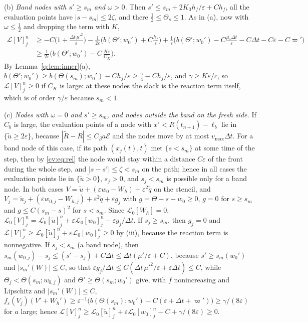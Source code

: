 \documentclass[11pt]{amsart}
\theoremstyle{definition}
\theoremstyle{remark}
\newcommand{\ve}{\varepsilon}
\newcommand{\Lop}{\mathcal{L}}
\begin{document}
\smallskip
(b) \emph{Band nodes with $s'\ge s_m$ and $\omega>0$.} Then
$s'\le s_m+2K_0h_f/\ve+Ch_f$, all the
evaluation points have $|s-s_m|\le2\zeta$, and there $\frac12\le\Theta_s\le1$. As in (a), now with
$\omega\le\frac12$ and dropping the term with $K$,
\begin{align*}
\Lop[V]^n_j&\ge-C\Big(1+\frac{\Delta t\,\mu'^2}\ve\Big)-\frac1{2\ve}\Big(b(\Theta';w_0')+C\frac{h_f}\ve\Big)
+\frac1\ve\Big(b(\Theta';w_0')-C\frac{\mu_*\Delta t}\ve-C\Delta t-C\ve-C\varpi'\Big)\\
&\ge\frac1{2\ve}\Big(b(\Theta';w_0')-C\,\frac{K\ve}{C_K}\Big).
\end{align*}
By Lemma~\ref{q:lem:inner}(a), $b(\Theta';w_0')\ge b(\Theta(s_m);w_0')-Ch_f/\ve\ge\frac\gamma4-Ch_f/\ve$, and
$\gamma\ge K\ve/c$, so $\Lop[V]^n_j\ge0$ if $C_K$ is large: at these nodes the slack is the
reaction term itself, which is of order $\gamma/\ve$ because $s_m<1$.

\smallskip
(c) \emph{Nodes with $\omega=0$ and $s'\ge s_m$, and nodes outside the band on the fresh side.}
If $C_b$ is large, the evaluation points of a node with $x'<R(t_{n+1})-\ell_b$ lie in
$\{\tilde u\ge2\ve\}$, because $|\tilde R-R|\le C_\beta a\mathcal E$ and the nodes move by at most
$v_{\max}\Delta t$. For a band node of this case, if its path $(x_j(t),t)$ met $\{s<s_m\}$
at some time of the step, then by \eqref{cv:eq:rel} the node would stay within a distance
$C\ve$ of the front during the whole step, and $|s-s'|\le\zeta<s_m$ on the path; hence in
all cases the evaluation points lie in $\overline{\{\tilde u>0\}}$, $s_j>0$, and $s_j<s_m$ is
possible only for a band node. In both cases $V=\tilde u+(\ve w_0-W_h)+\ve^2\tilde q$ on the
stencil, and
$V_j=\tilde u_j+(\ve w_{0,j}-W_{h,j})+\ve^2\tilde q+\ve g_j$ with $g=\Theta-s-w_0\ge0$, $g=0$ for $s\ge s_m$ and
$g\le C(s_m-s)^2$ for $s<s_m$. Since $\Lop_0[W_h]=0$,
$\Lop_0[V]^n_j=\Lop_0[\tilde u]^n_j+\ve\Lop_0[w_0]^n_j-\ve g_j/\Delta t$. If $s_j\ge s_m$, then $g_j=0$ and
$\Lop[V]^n_j\ge\Lop_0[\tilde u]^n_j+\ve\Lop_0[w_0]^n_j\ge0$ by
(iii), because the reaction term is nonnegative. If $s_j<s_m$ (a band node), then
$s_m(w_{0,j})-s_j\le(s'-s_j)+C\Delta t\le\Delta t(\mu'/\ve+C)$, because $s'\ge s_m(w_0')$ and
$|s_m'(W)|\le C$, so that $\ve g_j/\Delta t\le C(\Delta t\,\mu'^2/\ve+\ve\Delta t)\le C$, while $\Theta_j<\Theta(s_m;w_{0,j})$ and
$\Theta'\ge\Theta(s_m;w_0')$ give, with $f$ nonincreasing and Lipschitz and $|s_m'(W)|\le C$,
$f_\ve(V_j)(V'+W_h')\ge\ve^{-1}\big(b(\Theta(s_m);w_0')-C(\ve+\Delta t+\varpi')\big)\ge\gamma/(8\ve)$ for $a$ large;
hence
$\Lop[V]^n_j\ge\Lop_0[\tilde u]^n_j+\ve\Lop_0[w_0]^n_j-C+\gamma/(8\ve)\ge0$.
\end{document}
